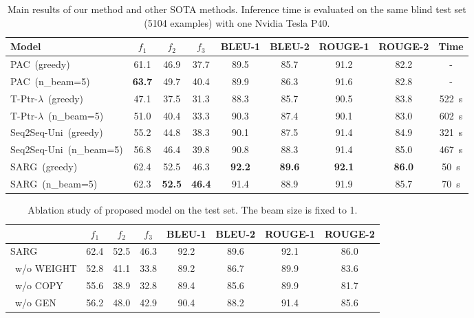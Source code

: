 \begin{table*}[!htb]
	\centering
	
	\begin{tabular}{|l|ccc|cccc|c|}
		\hline
		Model & $f_1$ & $f_2$ & $f_3$ & BLEU-1 & BLEU-2 & ROUGE-1 & ROUGE-2   & Time \\ \hline
		PAC\ (greedy) & 61.1 & 46.9 & 37.7 & 89.5 & 85.7 & 91.2 & 82.2 &-\\
		PAC\ (n\_beam=5) & \textbf{63.7} & 49.7 & 40.4 & 89.9 & 86.3 & 91.6 & 82.8   & - \\ \hline
		T-Ptr-$\lambda$\ (greedy) & 47.1 & 37.5 & 31.3  & 88.3 & 85.7 & 90.5 & 83.8 & 522\ s \\ 
		T-Ptr-$\lambda$\ (n\_beam=5) & 51.0 & 40.4 & 33.3  & 90.3 & 87.4 & 90.1 & 83.0 & 602\ s \\ \hline
		Seq2Seq-Uni\ (greedy)  & 55.2 & 44.8 & 38.3 & 90.1 & 87.5 & 91.4 & 84.9 & 321\ s \\ 
		Seq2Seq-Uni\ (n\_beam=5)  & 56.8 & 46.4 & 39.8  & 90.8 & 88.3 & 91.4 & 85.0 & 467\ s \\ \hline
		SARG\ (greedy) & 62.4 & 52.5 & 46.3  & \textbf{92.2} & \textbf{89.6} & \textbf{92.1} & \textbf{86.0} & 50\ s \\ 
		SARG\ (n\_beam=5) & 62.3 & \textbf{52.5} & \textbf{46.4} & 91.4 & 88.9 & 91.9 & 85.7 & 70\ s \\ \hline
	\end{tabular}
	\caption{Main results of our method and other SOTA methods. Inference time is evaluated on the same blind test set (5104 examples) with one Nvidia Tesla P40.}\label{mainrlt}
\end{table*}

\begin{table*}[!htb]
	\centering
	\begin{tabular}{|l|ccc|cccc|}
		\hline
		& $f_1$ & $f_2$ & $f_3$  & BLEU-1 & BLEU-2 & ROUGE-1 & ROUGE-2\\ \hline
		SARG  & 62.4 & 52.5 & 46.3  & 92.2 & 89.6 & 92.1 & 86.0 \\ \hline
		\ w/o WEIGHT  & 52.8 & 41.1 & 33.8 & 89.2 & 86.7 & 89.9 & 83.6 \\ \hline
		\ w/o COPY  & 55.6 & 38.9 & 32.8 & 89.4 & 85.6 & 89.9 & 81.7 \\ \hline
		\ w/o GEN & 56.2 & 48.0 & 42.9 & 90.4 & 88.2 & 91.4 & 85.6 \\ \hline
	\end{tabular}
	\caption{Ablation study of proposed model on the test set. The beam size is fixed to 1.}\label{ablation}
\end{table*}

